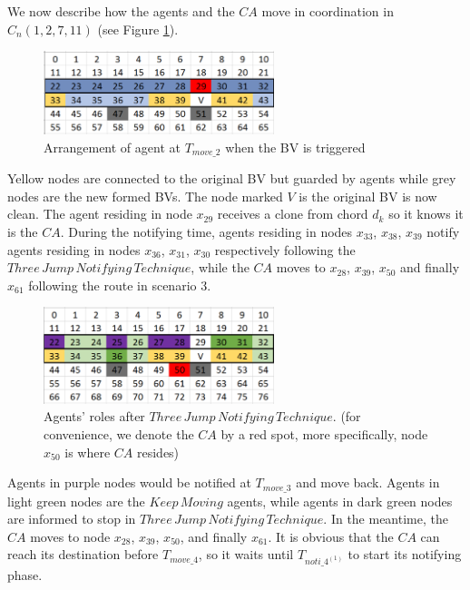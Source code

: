 We now describe how  the agents and the $CA$ move in coordination  in   $C_n(1, 2, 7, 11)$  (see Figure \ref{fig:T29}). 
\begin{figure}[H]
  \centering  
  \includegraphics[width=0.6\textwidth]{figures/T29.png}
  \caption{Arrangement of agent at $T_{move\_2}$ when the BV is triggered}\label{fig:T29}
\end{figure}

Yellow nodes are connected to the original BV but guarded by agents while   grey nodes are the new formed BVs. The node marked $V$ is the original BV is now clean. The agent residing in node $x_{29}$ receives a clone from chord $d_k$ so it knows it is the $CA$. During the notifying time, agents residing in nodes $x_{33}$, $x_{38}$, $x_{39}$ notify agents residing in nodes $x_{36}$, $x_{31}$, $x_{30}$ respectively following the $Three\,Jump\,Notifying\,Technique$,  while the $CA$ moves to $x_{28}$, $x_{39}$, $x_{50}$ and finally $x_{61}$ following the route in scenario 3.

\begin{figure}[H]
  \centering  
  \includegraphics[width=0.6\textwidth]{figures/T50.png}
  \caption{Agents' roles after $Three\,Jump\,Notifying\,Technique$. (for convenience, we denote the $CA$ by a red spot, more specifically, node $x_{50}$ is where $CA$ resides)}\label{fig:T50}
\end{figure}

Agents in purple nodes would be notified at $T_{move\_3}$ and move back. Agents in light green nodes are the $Keep\,Moving$ agents,  while agents in dark green nodes are informed to stop in $Three\,Jump\,Notifying\,Technique$. In the meantime, the $CA$ moves to node $x_{28}$, $x_{39}$, $x_{50}$, and finally $x_{61}$. It is obvious that the $CA$ can reach its destination before $T_{move\_4}$, so it waits until $T_{noti\_{4^{(1)}}}$ to start its notifying phase. 

